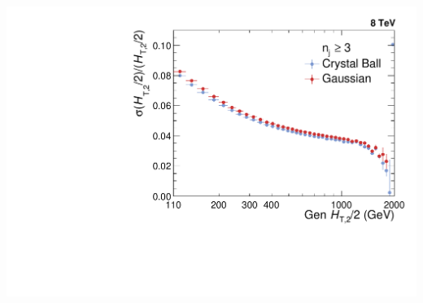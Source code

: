 \documentclass{beamer}
\begin{document}
\begin{frame}
\begin{center}
 ~~\includegraphics[scale=0.3]{Plots_HT_2_150/Comparison_Resolution_Crystal_Gauss_3.pdf}
\end{center}
\end{frame}
\end{document}
